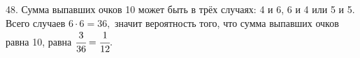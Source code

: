 48. Сумма выпавших очков 10 может быть в трёх случаях: 4 и 6, 6 и 4 или 5 и 5. Всего случаев $6\cdot6=36,$ значит вероятность того, что сумма выпавших очков равна 10, равна $\cfrac{3}{36}=\cfrac{1}{12}.$\\
